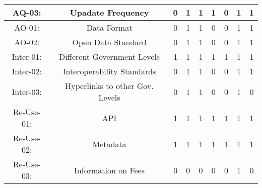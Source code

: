 \documentclass[a4paper, twoside]{report}
\begin{document}
\begin{table}[htbp]
\begin{adjustbox}{max width=\linewidth}
\begin{tabular}{rcccccccc}
    \multicolumn{1}{c}{AQ-03:} & \multicolumn{1}{p{19em}}{\cellcolor[rgb]{ .749,  .749,  .749}Upadate Frequency} & \cellcolor[rgb]{ .749,  .749,  .749}0 & \cellcolor[rgb]{ .749,  .749,  .749}1 & \cellcolor[rgb]{ .749,  .749,  .749}1 & \cellcolor[rgb]{ .749,  .749,  .749}1 & \cellcolor[rgb]{ .749,  .749,  .749}0 & \cellcolor[rgb]{ .749,  .749,  .749}1 & \cellcolor[rgb]{ .749,  .749,  .749}1 \\
    \midrule
    \multicolumn{1}{c}{AO-01:} & \multicolumn{1}{p{19em}}{Data Format} & 0     & 1     & 1     & 0     & 0     & 1     & 1 \\
    \multicolumn{1}{c}{AO-02:} & \multicolumn{1}{p{19em}}{\cellcolor[rgb]{ .749,  .749,  .749}Open Data Standard} & \cellcolor[rgb]{ .749,  .749,  .749}0 & \cellcolor[rgb]{ .749,  .749,  .749}1 & \cellcolor[rgb]{ .749,  .749,  .749}1 & \cellcolor[rgb]{ .749,  .749,  .749}0 & \cellcolor[rgb]{ .749,  .749,  .749}0 & \cellcolor[rgb]{ .749,  .749,  .749}1 & \cellcolor[rgb]{ .749,  .749,  .749}1 \\
    \midrule
    \multicolumn{1}{c}{Inter-01:} & \multicolumn{1}{p{19em}}{Different Government Levels} & 1     & 1     & 1     & 1     & 1     & 1     & 1 \\
    \multicolumn{1}{c}{Inter-02:} & \multicolumn{1}{p{19em}}{\cellcolor[rgb]{ .749,  .749,  .749}Interoperability Standards} & \cellcolor[rgb]{ .749,  .749,  .749}0 & \cellcolor[rgb]{ .749,  .749,  .749}1 & \cellcolor[rgb]{ .749,  .749,  .749}1 & \cellcolor[rgb]{ .749,  .749,  .749}0 & \cellcolor[rgb]{ .749,  .749,  .749}0 & \cellcolor[rgb]{ .749,  .749,  .749}1 & \cellcolor[rgb]{ .749,  .749,  .749}1 \\
    \multicolumn{1}{c}{Inter-03:} & \multicolumn{1}{p{19em}}{\cellcolor[rgb]{ .749,  .749,  .749}Hyperlinks to other Gov. Levels} & \cellcolor[rgb]{ .749,  .749,  .749}0 & \cellcolor[rgb]{ .749,  .749,  .749}1 & \cellcolor[rgb]{ .749,  .749,  .749}1 & \cellcolor[rgb]{ .749,  .749,  .749}0 & \cellcolor[rgb]{ .749,  .749,  .749}0 & \cellcolor[rgb]{ .749,  .749,  .749}1 & \cellcolor[rgb]{ .749,  .749,  .749}0 \\
    \midrule
    \multicolumn{1}{c}{Re-Use-01:} & \multicolumn{1}{p{19em}}{API} & 1     & 1     & 1     & 1     & 1     & 1     & 1 \\
    \multicolumn{1}{c}{Re-Use-02:} & \multicolumn{1}{p{19em}}{Metadata} & 1     & 1     & 1     & 1     & 1     & 1     & 1 \\
    \multicolumn{1}{c}{Re-Use-03:} & \multicolumn{1}{p{19em}}{Information on Fees} & 0     & 0     & 0     & 0     & 0     & 1     & 0 \\

\end{tabular}
\end{adjustbox}
\end{table}
\end{document}
